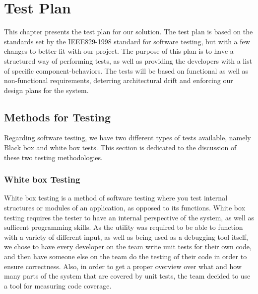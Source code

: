 \chapter{Test Plan}
This chapter presents the test plan for our solution. The test plan is based on
the standards set by the IEEE829-1998 standard for software testing\cite{IEEE829}, but with a
few changes to better fit with our project. The purpose of this plan is to have
a structured way of performing tests, as well as providing the developers with
a list of specific component-behaviors. The tests will be based on functional as
well as non-functional requirements, deterring architectural drift and
enforcing our design plans for the system.


\section{Methods for Testing}
Regarding software testing, we have two different types of tests available, namely Black box and white box tests. This section is dedicated to the discussion of these two testing methodologies.


\subsection{White box Testing}
White box testing is a method of software testing where you test internal structures or modules of an application, as opposed to its functions. White box testing requires the tester to have an internal perspective of the system, as well as sufficent programming skills. As the \gls{utility} was required to be able to function with a variety of different input, as well as being used as a debugging tool itself, we chose to have every developer on the team write unit tests for their own code, and then have someone else on the team do the testing of their code in order to ensure correctness. Also, in order to get a proper overview over what and how many parts of the system that are covered by unit tests, the team decided to use a tool for measuring code coverage.

